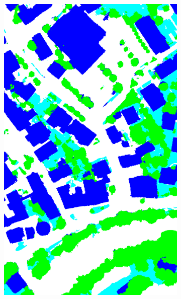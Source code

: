 \begin{figure}[htb]
\begin{subfigure}{0.19\textwidth}
  \includegraphics[width=1\linewidth]{fig/vai/26_anno.png}
\end{subfigure}
\begin{subfigure}{0.19\textwidth}
  \centering

\end{subfigure}
\end{figure}
